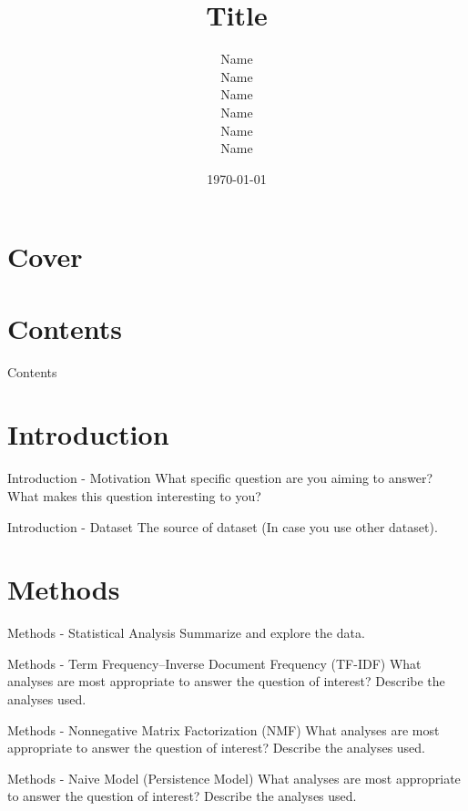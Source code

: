 \documentclass{beamer}
\title{Title}
\author{
  \parbox{0.3\textwidth}{
      \centering Name
  }
  \parbox{0.3\textwidth}{
      \centering Name
  }
  \parbox{0.3\textwidth}{
      \centering Name
  }
  \parbox{0.3\textwidth}{
      \centering Name
  }
  \parbox{0.3\textwidth}{
      \centering Name
  }
  \parbox{0.3\textwidth}{
      \centering Name
  }
}
\date{\today}
\begin{document}
\section*{Cover}
\frame{\titlepage}

\section*{Contents}
\begin{frame}{Contents}
  \tableofcontents
\end{frame}

\section{Introduction}

\begin{frame}{Introduction - Motivation}
  What specific question are you aiming to answer?
  What makes this question interesting to you?
\end{frame}

\begin{frame}{Introduction - Dataset}
  The source of dataset (In case you use other dataset).
\end{frame}

\section{Methods}

\begin{frame}{Methods - Statistical Analysis}
  Summarize and explore the data.
\end{frame}

\begin{frame}{Methods - Term Frequency–Inverse Document Frequency (TF-IDF)}
  What analyses are most appropriate to answer the question of interest?
  Describe the analyses used.
\end{frame}

\begin{frame}{Methods - Nonnegative Matrix Factorization (NMF)}
  What analyses are most appropriate to answer the question of interest?
  Describe the analyses used.
\end{frame}

\begin{frame}{Methods - Naive Model (Persistence Model)}
  What analyses are most appropriate to answer the question of interest?
  Describe the analyses used.
\end{frame}
\end{document}
